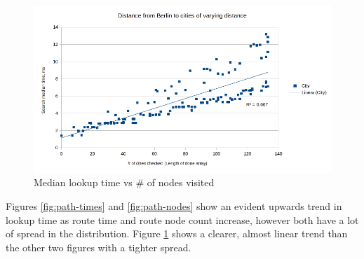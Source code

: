 \documentclass[a4paper,11pt]{article}
\begin{document}
    \begin{figure}[H]
        \centering
        \includegraphics[width=\textwidth]{times-donearr.png}
        \caption{Median lookup time vs \# of nodes visited}
        \label{fig:path-cities}
    \end{figure}

    Figures \ref{fig:path-times} and \ref{fig:path-nodes} show an evident upwards trend in lookup time as route time and route node count increase, however both have a lot of spread in the distribution. Figure \ref{fig:path-cities} shows a clearer, almost linear trend than the other two figures with a tighter spread.
\end{document}
